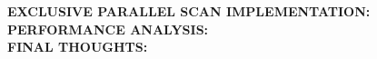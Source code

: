 \documentclass[a4paper,10pt]{article}
\begin{document}
\bigskip
{}
\makeatletter{}\makeatother
\label{sec:parallel-scan}
\noindent
\textbf{EXCLUSIVE PARALLEL SCAN IMPLEMENTATION:}
\\

\bigskip
{}
\makeatletter\def\@currentlabel{\texttt{(III)}}\makeatother
\label{sec:performance-analysis}
\noindent
\textbf{PERFORMANCE ANALYSIS:}
\\

\bigskip
{}
\makeatletter\def\@currentlabel{\texttt{(IV)}}\makeatother
\label{sec:final-thoughts}
\noindent
\textbf{FINAL THOUGHTS:}
\\

\clearpage

\printbibliography
\end{document}
